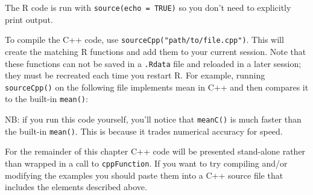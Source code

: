 \begin{Shaded}
\begin{Highlighting}[]
\CommentTok{*/}
\end{Highlighting}
\end{Shaded}

The R code is run with \texttt{source(echo\ =\ TRUE)} so you don't need
to explicitly print output.

To compile the C++ code, use \texttt{sourceCpp("path/to/file.cpp")}.
This will create the matching R functions and add them to your current
session. Note that these functions can not be saved in a \texttt{.Rdata}
file and reloaded in a later session; they must be recreated each time
you restart R. For example, running \texttt{sourceCpp()} on the
following file implements mean in C++ and then compares it to the
built-in \texttt{mean()}:

\begin{Shaded}
\begin{Highlighting}[]
 

  \NormalTok{;}

  \NormalTok{(}
\NormalTok{  \}}
\NormalTok{\}}

\CommentTok{)}
\CommentTok{*/}
\end{Highlighting}
\end{Shaded}

NB: if you run this code yourself, you'll notice that \texttt{meanC()}
is much faster than the built-in \texttt{mean()}. This is because it
trades numerical accuracy for speed.

For the remainder of this chapter C++ code will be presented stand-alone
rather than wrapped in a call to \texttt{cppFunction}. If you want to
try compiling and/or modifying the examples you should paste them into a
C++ source file that includes the elements described above.

